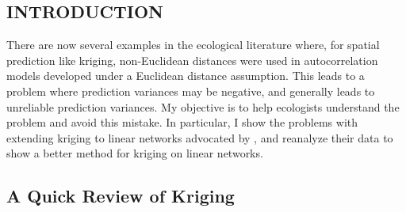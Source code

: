 \documentclass[11pt, titlepage]{article}\usepackage[]{graphicx}\usepackage[]{color}
\begin{document}

\newpage
\begin{spacing}{1.9}
\begin{flushleft}
\setlength{\parindent}{1cm}



\section*{INTRODUCTION}

There are now several examples in the ecological literature where, for spatial prediction like kriging, non-Euclidean distances were used in autocorrelation models developed under a Euclidean distance assumption.  This leads to a problem where prediction variances may be negative, and generally leads to unreliable prediction variances.  My objective is to help ecologists understand the problem and avoid this mistake.  In particular, I show the problems with extending kriging to linear networks advocated by \citet{Ladl:Avga:Whea:Boyc:pred:2016}, and reanalyze their data to show a better method for kriging on linear networks.

\subsection*{A Quick Review of Kriging}


\end{flushleft}
\end{spacing}
\end{document}
